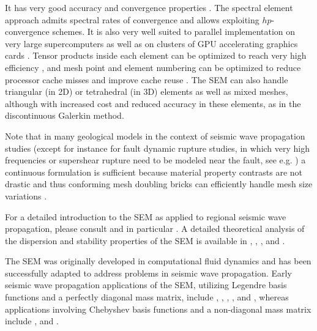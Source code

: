 \documentclass[oneside,english,onecolumn,letterpaper]{book}
\begin{document}
It has very good accuracy and convergence properties \citep{MaPa89,SePr94,DeFiMu02,Coh02,DeSe07,SeOl08,AiWa09,AiWa10,MeStTh12}.
The spectral element approach admits spectral rates of convergence and allows exploiting $hp$-convergence schemes.
It is also very well suited to parallel implementation on very large supercomputers \citep{KoTsChTr03,TsKoChTr03,KoLaMi08a,CaKoLaTiMiLeSnTr08,KoViCh10}
as well as on clusters of GPU accelerating graphics cards \citep{Kom11,MiKo10,KoMiEr09,KoErGoMi10}.
Tensor products inside each element can be optimized to reach very high efficiency \citep{DeFiMu02}, and mesh point and element numbering can be optimized to reduce processor cache misses and improve cache reuse \citep{KoLaMi08a}. The SEM can also handle triangular (in 2D) or tetrahedral (in 3D) elements \citep{WinBoyd96,TaWi00,KoMaTrTaWi01,Coh02,MeViSa06} as well as mixed meshes, although with increased cost and reduced accuracy in these elements, as in the discontinuous Galerkin method.

Note that in many geological models in the context of seismic wave propagation studies
(except for instance for fault dynamic rupture studies, in which very high frequencies or supershear rupture need to be modeled near the fault, see e.g. \cite{BeGlCrViPi07,BeGlCrVi09,PuAmKa09,TaCrEtViBeSa10})
a continuous formulation is sufficient because material property contrasts are not drastic and thus
conforming mesh doubling bricks can efficiently handle mesh size variations \citep{KoTr02a,KoLiTrSuStSh04,LeChLiKoHuTr08,LeChKoHuTr09,LeKoHuTr09}.

For a detailed introduction to the SEM as applied to regional
seismic wave propagation, please consult \citet{PeKoLuMaLeCaLeMaLiBlNiBaTr11,TrKoLi08,KoVi98,KoTr99,ChKoViCaVaFe07} and
in particular \citet{LeKoHuTr09,LeChKoHuTr09,LeChLiKoHuTr08,GoAmTaCaSmSaMaKo09,WiKoScTr04,KoLiTrSuStSh04}.
A detailed theoretical analysis of the dispersion
and stability properties of the SEM is available in \citet{Coh02}, \citet{DeSe07}, \citet{SeOl07}, \citet{SeOl08} and \citet{MeStTh12}.

The SEM was originally developed in computational fluid dynamics \citep{Pat84,MaPa89}
and has been successfully adapted to address problems in seismic wave propagation.
Early seismic wave propagation applications of the SEM, utilizing Legendre basis functions and a
perfectly diagonal mass matrix, include \cite{CoJoTo93}, \cite{Kom97},
\cite{FaMaPaQu97}, \cite{CaGa97}, \cite{KoVi98} and \cite{KoTr99},
whereas applications involving Chebyshev basis functions and a non-diagonal mass matrix
include \cite{SePr94}, \cite{PrCaSe94} and \cite{SePrPr95}.
\end{document}
